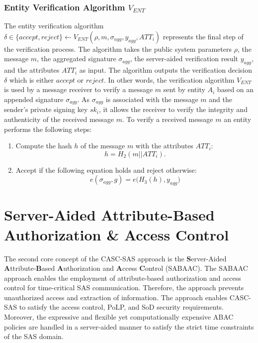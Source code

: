 \subsubsection{Entity Verification Algorithm $V_{ENT}$}
The entity verification algorithm $\delta \in \{accept, reject\} \leftarrow V_{ENT}(\rho, m, \sigma_{agg}, y_{agg}, ATT_i)$ represents the final step of the verification process.
The algorithm takes the public system parameters $\rho$, the message $m$, the aggregated signature $\sigma_{agg}$, the server-aided verification result $y_{agg}$, and the attributes $ATT_i$ as input.
The algorithm outputs the verification decision $\delta$ which is either $accept$ or $reject$.
In other words, the verification algorithm $V_{ENT}$ is used by a message receiver to verify a message $m$ sent by entity $A_i$ based on an appended signature $\sigma_{agg}$.
As $\sigma_{agg}$ is associated with the message $m$ and the sender's private signing key $sk_i$, it allows the receiver to verify the integrity and authenticity of the received message $m$.
To verify a received message $m$ an entity performs the following steps:
\begin{enumerate}
    \item Compute the hash $h$ of the message $m$ with the attributes $ATT_i$:
    \[
        h = H_2(m || ATT_i).
    \]
    \item Accept if the following equation holds and reject otherwise:
    \[
        e(\sigma_{agg}, g) {=} e\big(H_3(h), y_{agg}\big)
    \]
\end{enumerate}

\section{Server-Aided Attribute-Based Authorization \& Access Control}
\label{sec:approach:sabaac}
The second core concept of the CASC-SAS approach is the \textbf{S}erver-Aided \textbf{A}ttribute-\textbf{B}ased \textbf{A}uthorization and \textbf{A}ccess \textbf{C}ontrol (SABAAC).
The SABAAC approach enables the employment of attribute-based authorization and access control for time-critical SAS communication.
Therefore, the approach prevents unauthorized access and extraction of information.
The approach enables CASC-SAS to satisfy the access control, PoLP, and SoD security requirements.
Moreover, the expressive and flexible yet computationally expensive ABAC policies are handled in a server-aided manner to satisfy the strict time constraints of the SAS domain.

